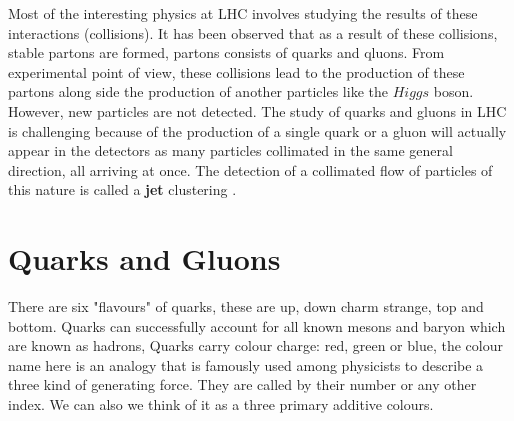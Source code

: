 Most of the interesting physics at LHC involves studying the results of these interactions (collisions). It has been observed that as a result of these collisions, stable partons are formed, partons consists of quarks and qluons. From experimental point of view, these collisions lead to the production of these partons along side the production of another particles like the $Higgs$ boson. However, new particles are not detected.
The study of quarks and gluons in LHC is challenging because of the production of a single quark or a gluon will actually appear in the detectors as many particles collimated in the same general direction, all arriving at once. The detection of a collimated flow of particles of this nature is called a \textbf{jet} clustering\label{Lhc} \citep{Ellis:2007ib}.   



\section{Quarks and Gluons}

There are six "flavours" of quarks, these are up, down charm strange, top and bottom.
Quarks can successfully account for all known mesons and baryon which are known as hadrons,
%
%
Quarks carry colour charge: red, green or blue, the colour name here is an analogy  that is famously used among physicists to describe a three kind of generating force. They are called by their number or any other index. We can also we think of it as a three primary additive colours. 

